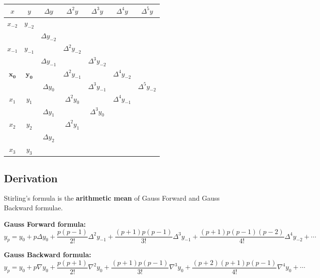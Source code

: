 \documentclass[12pt]{article}
\begin{document}
\begin{center}
\renewcommand{\arraystretch}{1.4}
\begin{tabular}{|c|c|c|c|c|c|c|}
  \hline
  \rowcolor{primary!90}
  {\color{white}$x$} & {\color{white}$y$} &
  {\color{white}$\Delta y$} & {\color{white}$\Delta^2 y$} &
  {\color{white}$\Delta^3 y$} & {\color{white}$\Delta^4 y$} & {\color{white}$\Delta^5 y$} \\
  \hline
  $x_{-2}$ & $y_{-2}$ & & & & & \\
  \hline
  \rowcolor{lightbg!50}
  & & $\Delta y_{-2}$ & & & & \\
  \hline
  $x_{-1}$ & $y_{-1}$ & & $\Delta^2 y_{-2}$ & & & \\
  \hline
  \rowcolor{lightbg!50}
  & & $\Delta y_{-1}$ & & $\Delta^3 y_{-2}$ & & \\
  \hline
  \rowcolor{accent!10}
  $\mathbf{x_0}$ & $\mathbf{y_0}$ & & $\Delta^2 y_{-1}$ & & $\Delta^4 y_{-2}$ & \\
  \hline
  \rowcolor{lightbg!50}
  & & $\Delta y_0$ & & $\Delta^3 y_{-1}$ & & $\Delta^5 y_{-2}$ \\
  \hline
  $x_1$ & $y_1$ & & $\Delta^2 y_0$ & & $\Delta^4 y_{-1}$ & \\
  \hline
  \rowcolor{lightbg!50}
  & & $\Delta y_1$ & & $\Delta^3 y_0$ & & \\
  \hline
  $x_2$ & $y_2$ & & $\Delta^2 y_1$ & & & \\
  \hline
  \rowcolor{lightbg!50}
  & & $\Delta y_2$ & & & & \\
  \hline
  $x_3$ & $y_3$ & & & & & \\
  \hline
\end{tabular}
\end{center}

\subsection*{Derivation}

Stirling's formula is the \textbf{arithmetic mean} of Gauss Forward and Gauss Backward formulae.

\medskip
\textbf{Gauss Forward formula:}
\[
  y_p = y_0 + p\Delta y_0 + \frac{p(p-1)}{2!}\Delta^2 y_{-1}
  + \frac{(p+1)p(p-1)}{3!}\Delta^3 y_{-1}
  + \frac{(p+1)p(p-1)(p-2)}{4!}\Delta^4 y_{-2} + \cdots
\]

\textbf{Gauss Backward formula:}
\[
  y_p = y_0 + p\nabla y_0 + \frac{p(p+1)}{2!}\nabla^2 y_0
  + \frac{(p+1)p(p-1)}{3!}\nabla^3 y_0
  + \frac{(p+2)(p+1)p(p-1)}{4!}\nabla^4 y_0 + \cdots
\]
\end{document}
